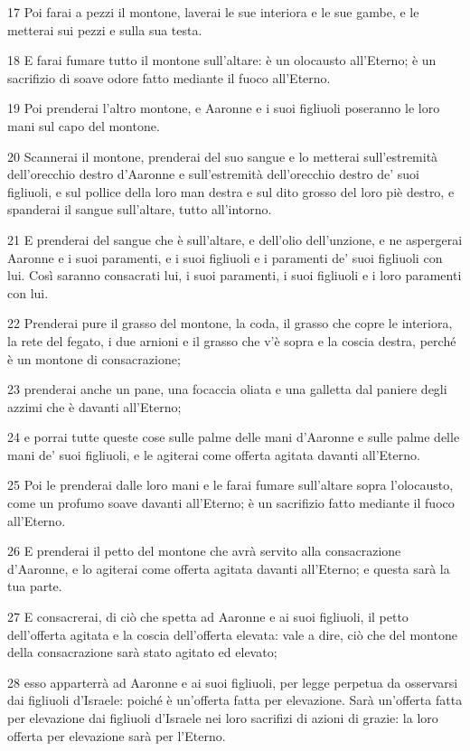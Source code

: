 \par 17 Poi farai a pezzi il montone, laverai le sue interiora e le sue gambe, e le metterai sui pezzi e sulla sua testa.
\par 18 E farai fumare tutto il montone sull'altare: è un olocausto all'Eterno; è un sacrifizio di soave odore fatto mediante il fuoco all'Eterno.
\par 19 Poi prenderai l'altro montone, e Aaronne e i suoi figliuoli poseranno le loro mani sul capo del montone.
\par 20 Scannerai il montone, prenderai del suo sangue e lo metterai sull'estremità dell'orecchio destro d'Aaronne e sull'estremità dell'orecchio destro de' suoi figliuoli, e sul pollice della loro man destra e sul dito grosso del loro piè destro, e spanderai il sangue sull'altare, tutto all'intorno.
\par 21 E prenderai del sangue che è sull'altare, e dell'olio dell'unzione, e ne aspergerai Aaronne e i suoi paramenti, e i suoi figliuoli e i paramenti de' suoi figliuoli con lui. Così saranno consacrati lui, i suoi paramenti, i suoi figliuoli e i loro paramenti con lui.
\par 22 Prenderai pure il grasso del montone, la coda, il grasso che copre le interiora, la rete del fegato, i due arnioni e il grasso che v'è sopra e la coscia destra, perché è un montone di consacrazione;
\par 23 prenderai anche un pane, una focaccia oliata e una galletta dal paniere degli azzimi che è davanti all'Eterno;
\par 24 e porrai tutte queste cose sulle palme delle mani d'Aaronne e sulle palme delle mani de' suoi figliuoli, e le agiterai come offerta agitata davanti all'Eterno.
\par 25 Poi le prenderai dalle loro mani e le farai fumare sull'altare sopra l'olocausto, come un profumo soave davanti all'Eterno; è un sacrifizio fatto mediante il fuoco all'Eterno.
\par 26 E prenderai il petto del montone che avrà servito alla consacrazione d'Aaronne, e lo agiterai come offerta agitata davanti all'Eterno; e questa sarà la tua parte.
\par 27 E consacrerai, di ciò che spetta ad Aaronne e ai suoi figliuoli, il petto dell'offerta agitata e la coscia dell'offerta elevata: vale a dire, ciò che del montone della consacrazione sarà stato agitato ed elevato;
\par 28 esso apparterrà ad Aaronne e ai suoi figliuoli, per legge perpetua da osservarsi dai figliuoli d'Israele: poiché è un'offerta fatta per elevazione. Sarà un'offerta fatta per elevazione dai figliuoli d'Israele nei loro sacrifizi di azioni di grazie: la loro offerta per elevazione sarà per l'Eterno.
